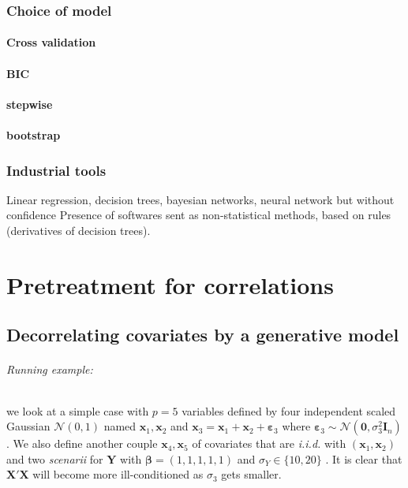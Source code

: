 \documentclass[12pt,a4paper]{report}
\begin{document}
		\section{Choice of model}
			\subsection{Cross validation}
			\subsection{BIC}
			\subsection{stepwise}
			\subsection{bootstrap}

		\section{Industrial tools}
			Linear regression, decision trees, bayesian networks, neural network but without confidence
			Presence of softwares sent as non-statistical methods, based on rules (derivatives of decision trees).			
			
\part{Pretreatment for correlations}
\chapter{Decorrelating covariates by a generative model}

\paragraph{Running example:} we look at a simple case with $p=5$ variables defined by four independent scaled Gaussian $\mathcal{N}(0,1)$ named $\boldsymbol{x}_1,\boldsymbol{x}_2$ and $\boldsymbol{x}_3=\boldsymbol{x}_1+\boldsymbol{x}_2+\boldsymbol{\varepsilon}_3$ where $\boldsymbol{\varepsilon}_3\sim{\mathcal{N}(\boldsymbol{0},\sigma_3^2\boldsymbol{I}_n)}$. We also define another couple $\boldsymbol{x}_4,\boldsymbol{x}_5$ of covariates that are {\it i.i.d. } with $(\boldsymbol{x}_1,\boldsymbol{x}_2)$ and two {\it scenarii} for $\boldsymbol{Y}$ with $\boldsymbol{\beta}=(1,1,1,1,1)$ and $\sigma_Y \in \{10,20\}$ .
It is clear that $\boldsymbol{X}'\boldsymbol{X}$ will become more ill-conditioned as $\sigma_3$ gets smaller.
	
\end{document}
